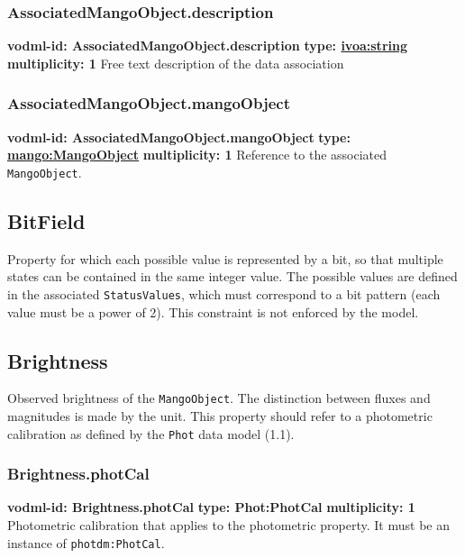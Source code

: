     \subsubsection{AssociatedMangoObject.description}
      \textbf{vodml-id: AssociatedMangoObject.description} \newline
      \textbf{type: \hyperref[sect:ivoa]{ivoa:string}} \newline
      \textbf{multiplicity: 1} \newline
      Free text description of the data association

    \subsubsection{AssociatedMangoObject.mangoObject}
      \textbf{vodml-id: AssociatedMangoObject.mangoObject} \newline
      \textbf{type: \hyperref[sect:MangoObject]{mango:MangoObject}} \newline
      \textbf{multiplicity: 1} \newline
      Reference to the associated \texttt{MangoObject}.

  \subsection{BitField}
  \label{sect:BitField}
    Property for which each possible value is represented by a bit, so that multiple states can be contained in the same integer value. The possible values are defined in the associated \texttt{StatusValues}, which must correspond to a bit pattern (each value must be a power of 2). This constraint is not enforced by the model.

  \subsection{Brightness}
  \label{sect:Brightness}
    Observed brightness of the \texttt{MangoObject}. The distinction between fluxes and magnitudes is made by the unit. This property should refer to a photometric calibration as defined by the \texttt{Phot} data model (1.1).

    \subsubsection{Brightness.photCal}
      \textbf{vodml-id: Brightness.photCal} \newline
      \textbf{type: Phot:PhotCal} \newline
      \textbf{multiplicity: 1} \newline
      Photometric calibration that applies to the photometric property. It must be an instance of \texttt{photdm:PhotCal}.

